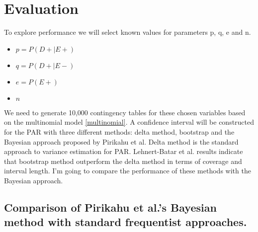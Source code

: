 \chapter{Evaluation} \label{sec:Evaluation}

To explore performance we will select known values for parameters p, q, e and n. 
\begin{itemize}
    \item $p = P(D + |E+)$
    \item $q = P(D + |E-)$
    \item $e = P(E+)$
    \item $n$
\end{itemize}

We need to generate 10,000 contingency tables for these chosen variables based on the multinomial model \ref{multinomial}. A confidence interval will be constructed for the PAR with three different methods: delta method, bootstrap and the Bayesian approach proposed by Pirikahu et al. Delta method is the standard approach to variance estimation for PAR. Lehnert-Batar et al. results indicate that bootstrap method outperform the delta method in terms of coverage and interval length. I'm going to compare the performance of these methods with the Bayesian approach.

\section{Comparison of Pirikahu et al.'s Bayesian method with standard frequentist approaches.}
